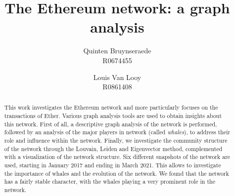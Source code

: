 \documentclass[10pt,a4paper]{article}
\author{Quinten Bruynseraede  \\ R0674455 \and Louis Van Looy \\ R0861408}
\title{The Ethereum network: a graph analysis}
\begin{document}
\maketitle

\begin{abstract}
	
This work investigates the Ethereum network and more particularly focuses on the transactions of Ether. Various graph analysis tools are used to obtain insights about this network. First of all, a descriptive graph analysis of the network is performed, followed by an analysis of the major players in network (called \textit {whales}), to address their role and influence within the network. Finally, we investigate the community structure of the network through the Louvain, Leiden and Eigenvector method, complemented with a visualization of the network structure. Six different snapshots of the network are used, starting in January 2017 and ending in March 2021. This allows to investigate the importance of whales and the evolution of the network. We found that the network has a fairly stable character, with the whales playing a very prominent role in the network. 

\end{abstract}
\end{document}
